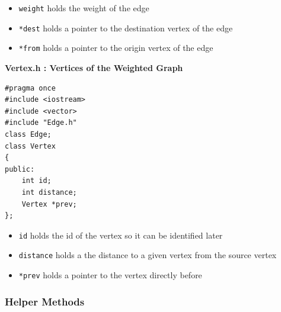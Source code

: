 \documentclass[letterpaper, 10pt]{article}
\begin{document}
\begin{itemize}
    \item \texttt{weight} holds the weight of the edge
    \item \texttt{*dest} holds a pointer to the destination vertex of the edge
    \item \texttt{*from} holds a pointer to the origin vertex of the edge
\end{itemize}


\textbf{Vertex.h : Vertices of the Weighted Graph}
 \begin{addmargin}[-5em]{1em}
\begin{small}
\begin{verbatim}
#pragma once
#include <iostream>
#include <vector>
#include "Edge.h"
class Edge;
class Vertex
{
public:
    int id;
    int distance;
    Vertex *prev;
};

\end{verbatim}
\end{small}
\end{addmargin}   

\begin{itemize}
    \item \texttt{id} holds the id of the vertex so it can be identified later
    \item \texttt{distance} holds a the distance to a given vertex from the source vertex
    \item \texttt{*prev} holds a pointer to the vertex directly before
\end{itemize}

\subsubsection{Helper Methods}
\end{document}
